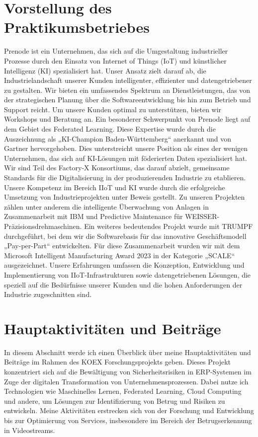 \documentclass[11pt]{article}
\begin{document}
\section{Vorstellung des Praktikumsbetriebes}
Prenode ist ein Unternehmen, das sich auf die Umgestaltung industrieller Prozesse durch den Einsatz von Internet of Things (IoT) und künstlicher Intelligenz (KI) spezialisiert hat. Unser Ansatz zielt darauf ab, die Industrielandschaft unserer Kunden intelligenter, effizienter und datengetriebener zu gestalten. Wir bieten ein umfassendes Spektrum an Dienstleistungen, das von der strategischen Planung über die Softwareentwicklung bis hin zum Betrieb und Support reicht. Um unsere Kunden optimal zu unterstützen, bieten wir Workshops und Beratung an.
\newline
Ein besonderer Schwerpunkt von Prenode liegt auf dem Gebiet des Federated Learning. Diese Expertise wurde durch die Auszeichnung als „KI-Champion Baden-Württemberg“ anerkannt und von Gartner hervorgehoben. Dies unterstreicht unsere Position als eines der wenigen Unternehmen, das sich auf KI-Lösungen mit föderierten Daten spezialisiert hat.
\newline
Wir sind Teil des Factory-X Konsortiums, das darauf abzielt, gemeinsame Standards für die Digitalisierung in der produzierenden Industrie zu etablieren. Unsere Kompetenz im Bereich IIoT und KI wurde durch die erfolgreiche Umsetzung von Industrieprojekten unter Beweis gestellt. Zu unseren Projekten zählen unter anderem die intelligente Überwachung von Anlagen in Zusammenarbeit mit IBM und Predictive Maintenance für WEISSER-Präzisionsdrehmaschinen.
\newline
Ein weiteres bedeutendes Projekt wurde mit TRUMPF durchgeführt, bei dem wir die Softwarebasis für das innovative Geschäftsmodell „Pay-per-Part“ entwickelten. Für diese Zusammenarbeit wurden wir mit dem Microsoft Intelligent Manufacturing Award 2023 in der Kategorie „SCALE“ ausgezeichnet. Unsere Erfahrungen umfassen die Konzeption, Entwicklung und Implementierung von IIoT-Infrastrukturen sowie datengetriebenen Lösungen, die speziell auf die Bedürfnisse unserer Kunden und die hohen Anforderungen der Industrie zugeschnitten sind.

\section{Hauptaktivitäten und Beiträge}
In diesem Abschnitt werde ich einen Überblick über meine Hauptaktivitäten und Beiträge im Rahmen des KOEX Forschungsprojekts geben. Dieses Projekt konzentriert sich auf die Bewältigung von Sicherheitsrisiken in ERP-Systemen im Zuge der digitalen Transformation von Unternehmensprozessen. Dabei nutze ich Technologien wie Maschinelles Lernen, Federated Learning, Cloud Computing und andere, um Lösungen zur Identifizierung von Betrug und Risiken zu entwickeln. Meine Aktivitäten erstrecken sich von der Forschung und Entwicklung bis zur Optimierung von Services, insbesondere im Bereich der Betrugserkennung in Videostreams.
\end{document}
